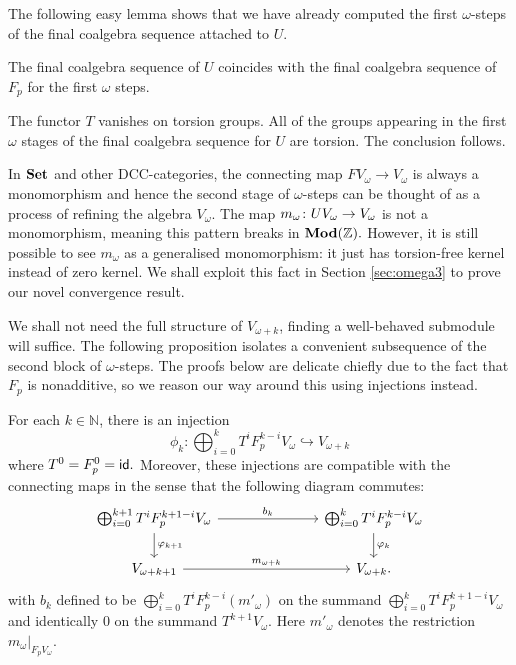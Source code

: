 \documentclass[runningheads]{llncs}
\begin{document}
The following easy lemma shows that we have already computed the first $\omega$-steps of the final coalgebra sequence attached to $U$.
\begin{lemmaE}
The final coalgebra sequence of $U$ coincides with the final coalgebra sequence of $F_p$ for the first $\omega$ steps.
\end{lemmaE}
\begin{proofE}
The functor $T$ vanishes on torsion groups. All of the groups appearing in the first $\omega$ stages of the final coalgebra sequence for $U$ are torsion. The conclusion follows.
\end{proofE}
\begin{remark}
In $\mathbf{Set}$ and other DCC-categories, the connecting map $FV_\omega \to V_\omega$ is always a monomorphism and hence the second stage of $\omega$-steps can be thought of as a process of refining the algebra $V_{\omega}$.
The map $m_{\omega} \colon UV_{\omega} \to V_{\omega}$ is not a monomorphism, meaning this pattern breaks in $\operatorname{\mathbf{Mod}}(\mathbb{Z}).$
However, it is still possible to see $m_{\omega}$ as a generalised monomorphism: it just has torsion-free kernel instead of zero kernel.
We shall exploit this fact in Section \ref{sec:omega3} to prove our novel convergence result.
\end{remark}
We shall not need the full structure of $V_{\omega +k}$, finding a well-behaved submodule will suffice. 
The following proposition isolates a convenient subsequence of the second block of $\omega$-steps. 
The proofs below are delicate chiefly due to the fact that $F_p$ is nonadditive, so we reason our way around this using injections instead.
\begin{propositionE}
\label{splitting}
For each $k\in \mathbb N$, there is an injection 
\begin{equation*}
\phi_k \colon \bigoplus_{i=0}^{k} T^i F_p^{k-i } V_{\omega} \hookrightarrow V_{\omega +k} 
\end{equation*}
where $T^0 = F_p^0 = \mathsf{id}.$ Moreover, these injections are compatible with the connecting maps in the sense that the following diagram commutes:
\begin{equation*}
\begin{tikzcd}[ampersand replacement=\&]
 \bigoplus_{i=0}^{k+1} T^i F_p^{k+1-i } V_\omega \dar{\phi_{k+1}}  \arrow[rrr, "b_k"] \&\&\& \bigoplus_{i=0}^{k} T^i F_p^{k-i } V_\omega \dar{\phi_k}
\\
V_{\omega +k+1} \arrow[rrr, "m_{\omega + k}"] \&\&\& V_{\omega +k}.
\end{tikzcd}
\end{equation*}
with $b_k$ defined to be $\bigoplus_{i=0}^{k} T^i F_p^{k-i} (m'_{\omega})$ on the summand $\bigoplus_{i=0}^{k} T^i F_p^{k+1-i } V_\omega$  and identically $0$ on the summand $T^{k+1}V_{\omega}$.
Here $m'_{\omega}$ denotes the restriction  $m_{\omega}|_{F_p V_{\omega} }$.
\end{propositionE}
\end{document}
